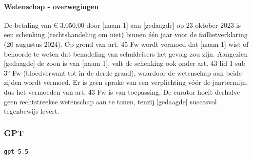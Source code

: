 \documentclass[
  dutch,
  a4paper,
]{article}
\begin{document}
\paragraph{Wetenschap - overwegingen}\label{wetenschap---overwegingen-27}

De betaling van € 3.050,00 door {[}naam 1{]} aan {[}gedaagde{]} op 23 oktober 2023 is een schenking (rechtshandeling om niet) binnen één jaar voor de faillietverklaring (20 augustus 2024). Op grond van art. 45 Fw wordt vermoed dat {[}naam 1{]} wist of behoorde te weten dat benadeling van schuldeisers het gevolg zou zijn. Aangezien {[}gedaagde{]} de zoon is van {[}naam 1{]}, valt de schenking ook onder art. 43 lid 1 sub 3° Fw (bloedverwant tot in de derde graad), waardoor de wetenschap aan beide zijden wordt vermoed. Er is geen sprake van een verplichting vóór de jaartermijn, dus het vermoeden van art. 43 Fw is van toepassing. De curator hoeft derhalve geen rechtstreekse wetenschap aan te tonen, tenzij {[}gedaagde{]} succesvol tegenbewijs levert.

\newpage


\subsubsection{GPT}\label{gpt-9}

\texttt{gpt-5.5}
\end{document}
